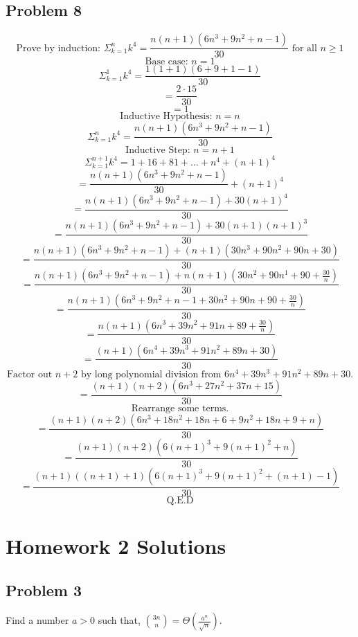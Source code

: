 \documentclass{article}
\begin{document}
\subsection{Problem 8}

$$\text{Prove by induction: } \Sigma_{k=1}^{n} k^4 = \frac{n(n+1)(6n^3 + 9n^2 + n - 1)}{30} \text{ for all } n \ge 1$$
$$\text{Base case: } n = 1 $$
$$\Sigma_{k=1}^{1} k^4 = \frac{1(1+1)(6+9+1-1)}{30}$$
$$= \frac{2\cdot15}{30}$$
$$= 1 $$
$$\text{Inductive Hypothesis: } n = n$$
$$\Sigma_{k=1}^{n} k^4 = \frac{n(n+1)(6n^3 + 9n^2 + n - 1)}{30}$$
$$\text{Inductive Step: } n = n+1$$
$$\Sigma_{k=1}^{n+1} k^4 = 1 + 16 + 81 + \dots + n^4 + (n+1)^4$$
$$= \frac{n(n+1)(6n^3 + 9n^2 + n - 1)}{30} + (n+1)^4$$
$$= \frac{n(n+1)(6n^3 + 9n^2 + n - 1) + 30(n+1)^4}{30} $$
$$= \frac{n(n+1)(6n^3 + 9n^2 + n - 1) + 30(n+1)(n+1)^3}{30} $$
$$= \frac{n(n+1)(6n^3 + 9n^2 + n - 1) + (n+1)(30n^3 + 90n^2 + 90n +30)}{30} $$
$$= \frac{n(n+1)(6n^3 + 9n^2 + n - 1) + n(n+1)(30n^2 + 90n^1 + 90 + \frac{30}{n})}{30} $$
$$= \frac{n(n+1)(6n^3 + 9n^2 + n - 1 + 30n^2 + 90n + 90 + \frac{30}{n})}{30} $$
$$= \frac{n(n+1)(6n^3 + 39n^2 + 91n + 89 + \frac{30}{n})}{30} $$
$$= \frac{(n+1)(6n^4 + 39n^3 + 91n^2 + 89n + 30)}{30} $$
$$\text{Factor out } n + 2 \text{ by long polynomial division from } 6n^4 + 39n^3 + 91n^2 + 89n + 30 \text{.}$$
$$= \frac{(n+1)(n+2)(6n^3 + 27n^2 + 37n + 15)}{30} $$
$$\text{Rearrange some terms.}$$
$$= \frac{(n+1)(n+2)(6n^3 + 18n^2 + 18n + 6 + 9n^2 + 18n + 9 + n)}{30} $$
$$= \frac{(n+1)(n+2)(6(n+1)^3 + 9(n+1)^2 + n)}{30} $$
$$= \frac{(n+1)((n + 1) + 1)(6(n+1)^3 + 9(n+1)^2 + (n + 1) - 1)}{30} $$
$$\text{Q.E.D}$$




\section{Homework 2 Solutions}

\subsection{Problem 3}
Find a number $a > 0$ such that, $\binom{3n}{n} = \Theta(\frac{a^n}{\sqrt{n}})$.
\end{document}
